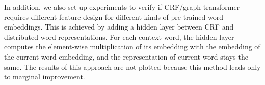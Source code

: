 In addition, we also set up experiments to verify if CRF/graph transformer requires different feature design for different kinds of pre-trained word embeddings. This is achieved by adding a hidden layer between CRF and distributed word representations. For each context word, the hidden layer computes the element-wise multiplication of its embedding with the embedding of the current word embedding, and the representation of current word stays the same. The results of this approach are not plotted because this method leads only to marginal improvement.




